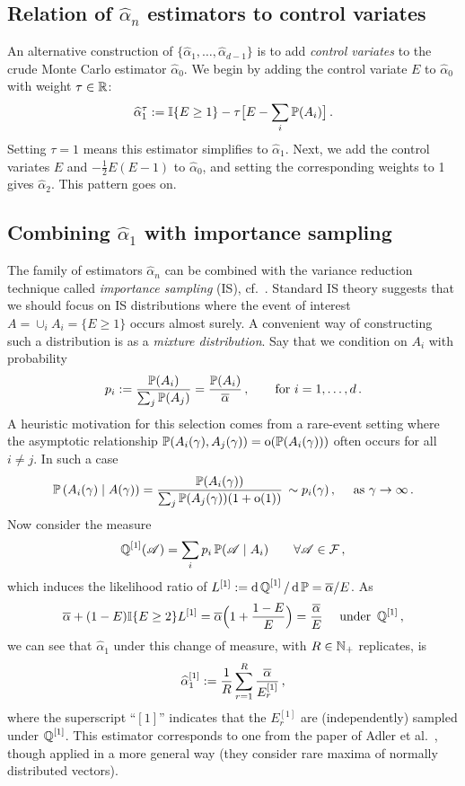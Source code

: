 \subsection{Relation of $\hat{\alpha}_n$ estimators to control variates}

An alternative construction of $\{\hat{\alpha}_1,\dots,\hat{\alpha}_{d-1}\}$
is to add \emph{control variates} to the crude Monte Carlo estimator
$\hat{\alpha}_0$.
We begin by adding the control variate $E$ to $\hat{\alpha}_0$ with weight $\tau \in \mathbb{R}$:
\[ \widehat{\alpha}_1^{\tau} := \mathbb{I}\{  E \ge 1  \} - \tau \bigl[ E - \sum_i \operatorname{{\mathbb P}}(A_i) \bigr] \,. \]
Setting $\tau=1$ means this estimator simplifies to $\hat{\alpha}_1$.
Next, we add the control variates $E$ and ${-}\frac12 E(E-1)$ to $\hat{\alpha}_0$, and setting the corresponding weights to 1 gives $\hat{\alpha}_2$. This pattern goes on.


\subsection{Combining $\hat{\alpha}_1$ with importance sampling} \label{scn:IS}

The family of estimators $\hat{\alpha}_n$ can be combined with the
variance reduction technique called \emph{importance sampling} (IS), cf.\ \cite{asmussen2007stochastic,glasserman2003monte}. Standard IS theory suggests that we should focus on IS distributions where the event of interest $A = \cup_i A_i = \{E \ge 1\}$ occurs almost surely.
A convenient way of constructing such a distribution is as a \emph{mixture distribution}. Say that we condition on $A_i$ with probability
\[ p_i := \frac{\operatorname{{\mathbb P}}(A_i)}{ \sum_j \operatorname{{\mathbb P}}(A_j) } = \frac{\operatorname{{\mathbb P}}(A_i)}{ \overline{\alpha}} \,,\qquad \text{for } i=1,\dots,d\,. \]
A heuristic motivation for this selection comes from a rare-event setting where the asymptotic relationship
$\operatorname{{\mathbb P}}(A_i(\gamma), A_j(\gamma))={\mathrm{o}}(\operatorname{{\mathbb P}}(A_i(\gamma)))$ often occurs for all $i\neq j$.
In such a case
\[
 \operatorname{{\mathbb P}}\left(A_i(\gamma) \mid A(\gamma) \right)
   = \dfrac{\operatorname{{\mathbb P}}(A_i(\gamma))}{\sum_j \operatorname{{\mathbb P}}(A_j(\gamma))(1 + {\mathrm{o}}(1))} \,   \sim p_i(\gamma) \,, \quad \text{ as } \gamma \to \infty\,. \]
Now consider the measure
\[ \operatorname{\mathbb Q}^{[1]}( \mathscr{A} ) = \sum_i p_i \operatorname{{\mathbb P}}( \mathscr{A} \mid A_i ) \qquad \forall \mathscr{A} \in \mathcal{F} \,,  \]
which induces the likelihood ratio of $L^{[1]} := \mathop{}\!\mathrm{d} \operatorname{\mathbb Q}^{[1]} / \mathop{}\!\mathrm{d} \operatorname{{\mathbb P}} = \overline{\alpha}/E$.
As
\[
  \overline{\alpha} + (1-E)\mathbb{I}\{ E \ge 2 \} L^{[1]}
  = \overline{\alpha} \Bigl( 1 + \frac{1-E}{E} \Bigr) \\
  = \frac{\overline{\alpha}}{E} \quad \text{ under } \operatorname{\mathbb Q}^{[1]}\, ,
\]
we can see that $\hat{\alpha}_1$ under this change of measure, with $R \in \mathbb{N}_+$ replicates, is
\begin{equation} \label{alpha_1_IS1}
  \widehat{\alpha}_{1}^{[1]} := \frac1R \sum_{r=1}^R \frac{\overline{\alpha}}{E_r^{[1]}} \,,
\end{equation}
where the superscript ``$[1]$'' indicates that the $E_r^{[1]}$ are (independently) sampled under $\operatorname{\mathbb Q}^{[1]}$. This estimator corresponds to one from the paper of Adler et al.\ \cite{adler1990introduction}, though applied in a  more general way (they consider rare maxima of normally distributed vectors).

